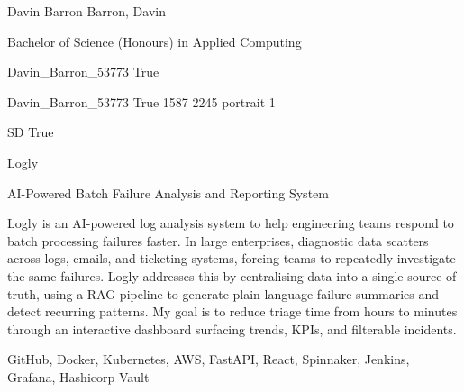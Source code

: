 
\begingroup{}\relax



\def\Key{Davin_Barron_53773}

{Davin Barron}
{Barron, Davin}

{Bachelor of Science (Honours) in Applied Computing}

{Davin_Barron_53773}
{True}

{Davin_Barron_53773}
{True}
{1587}
{2245}
{portrait}
{1}

{SD}
{True}

{Logly}

{AI-Powered Batch Failure Analysis and Reporting System}

{Logly is an AI-powered log analysis system to help engineering teams respond to batch processing failures faster. In large enterprises, diagnostic data scatters across logs, emails, and ticketing systems, forcing teams to repeatedly investigate the same failures. Logly addresses this by centralising data into a single source of truth, using a RAG pipeline to generate plain-language failure summaries and detect recurring patterns. My goal is to reduce triage time from hours to minutes through an interactive dashboard surfacing trends, KPIs, and filterable incidents.}

{GitHub, Docker, Kubernetes, AWS, FastAPI, React, Spinnaker, Jenkins, Grafana, Hashicorp Vault}

